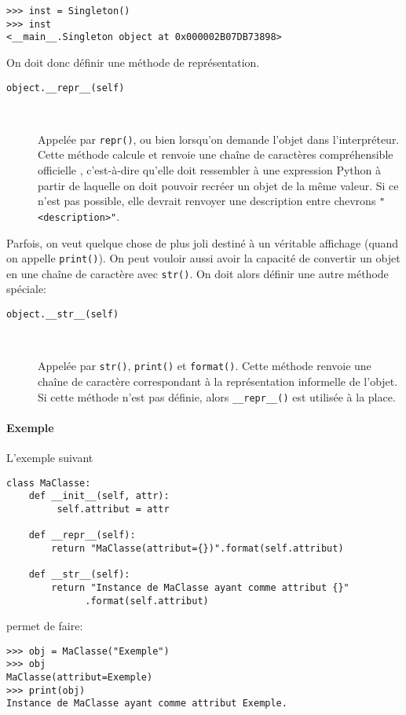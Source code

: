 \begin{verbatim}
>>> inst = Singleton()
>>> inst
<__main__.Singleton object at 0x000002B07DB73898>
\end{verbatim}

On doit donc définir une méthode de représentation.

\begin{description}
    \item[\texttt{object.__repr__(self)}]~

    Appelée par \texttt{repr()}, ou bien lorsqu'on demande l'objet dans l'interpréteur. Cette méthode calcule et renvoie une chaîne de caractères compréhensible \og officielle \fg{}, c'est-à-dire qu'elle doit ressembler à une expression Python à partir de laquelle on doit pouvoir recréer un objet de la même valeur. Si ce n'est pas possible, elle devrait renvoyer une description entre chevrons \texttt{"<description>"}. 
\end{description}

Parfois, on veut quelque chose de plus joli destiné à un véritable affichage (quand on appelle \texttt{print()}). On peut vouloir aussi avoir la capacité de convertir un objet en une chaîne de caractère avec \texttt{str()}. On doit alors définir une autre méthode spéciale:

\begin{description}
    \item[\texttt{object.__str__(self)}]~

    Appelée par \texttt{str()}, \texttt{print()} et \texttt{format()}. Cette méthode renvoie une chaîne de caractère correspondant à la représentation informelle de l'objet. Si cette méthode n'est pas définie, alors \texttt{__repr__()} est utilisée à la place.
\end{description}
\paragraph{Exemple} L'exemple suivant
\begin{verbatim}
class MaClasse:
    def __init__(self, attr):
         self.attribut = attr

    def __repr__(self):
        return "MaClasse(attribut={})".format(self.attribut)

    def __str__(self):
        return "Instance de MaClasse ayant comme attribut {}"
              .format(self.attribut)
\end{verbatim}
permet de faire:
\begin{verbatim}
>>> obj = MaClasse("Exemple")
>>> obj
MaClasse(attribut=Exemple)
>>> print(obj)
Instance de MaClasse ayant comme attribut Exemple.
\end{verbatim}

